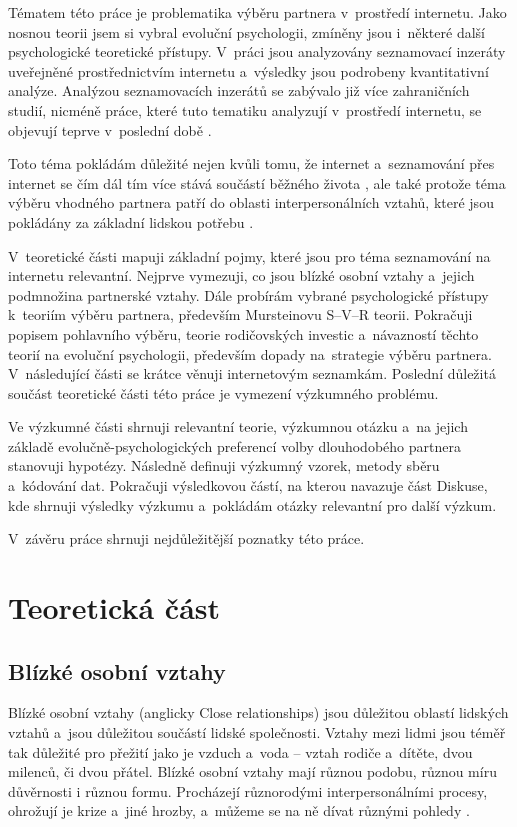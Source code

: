 \documentclass[a4paper, 12pt, notitlepage, oneside, numbers=noenddot]{report}
\begin{document}
Tématem této práce je problematika výběru partnera v~prostředí
internetu.  Jako nosnou teorii jsem si vybral evoluční psychologii,
zmíněny jsou i~některé další psychologické teoretické přístupy.
V~prá\-ci jsou analyzovány seznamovací inzeráty uveřejněné
prostřednictvím internetu a~výsledky jsou podrobeny kvantitativní
analýze.  Analýzou seznamovacích inzerátů se zabývalo již více
zahraničních studií, nicméně práce, které tuto tematiku analyzují
v~prostředí internetu, se objevují teprve v~poslední době
\citep{HallEtAl2010, EllisonEtAl2006, GibbsEtAl2006}.

Toto téma pokládám důležité nejen kvůli tomu, že internet
a~seznamování přes internet se čím dál tím více stává součástí běžného
života \citep{EllisonEtAl2006}, ale také protože téma výběru vhodného
partnera patří do oblasti interpersonálních vztahů, které jsou
pokládány za základní lidskou potřebu \citep{Slamenik2008}.

V~teoretické části mapuji základní pojmy, které jsou pro téma
seznamování na internetu relevantní.  Nejprve vymezuji, co jsou blízké
osobní vztahy a~jejich podmnožina partnerské vztahy.  Dále probírám
vybrané psychologické přístupy k~teoriím výběru partnera, především
Mursteinovu S--V--R teorii.  Pokračuji popisem pohlavního výběru,
teorie rodičovských investic a~návazností těchto teorií na evoluční
psychologii, především dopady na~strategie výběru partnera.
V~následující části se krátce věnuji internetovým seznam\-kám.  Poslední
důležitá součást teoretické části této práce je vymezení výzkum\-ného
pro\-blému.

Ve výzkumné části shrnuji relevantní teorie, výzkumnou otázku a~na
jejich základě evolučně-psychologických preferencí volby dlouhodobého
partnera stanovuji hypotézy.  Následně definuji výzkumný vzorek,
metody sběru a~kódování dat.  Pokračuji výsledkovou částí, na kterou
navazuje část Diskuse, kde shrnuji výsledky výzkumu a~pokládám otázky
relevantní pro další výzkum.

V~závěru práce shrnuji nejdůležitější poznatky této práce.

\chapter[Teoretická část]{Teoretická část}
\section{Blízké osobní vztahy}
Blízké osobní vztahy (anglicky Close relationships) jsou důležitou
oblastí lidských vztahů a~jsou důležitou součástí lidské společnosti.
Vztahy mezi lidmi jsou téměř tak důležité pro přežití jako je vzduch
a~voda -- vztah rodiče a~dítěte, dvou milenců, či dvou přátel.  Blízké
osobní vztahy mají různou podobu, různou míru důvěrnosti i různou
formu.  Procházejí různorodými interpersonálními procesy, ohrožují je
krize a~jiné hrozby, a~můžeme se na ně dívat různými pohledy
\citep{HendrickHendrick2000}.
\end{document}
